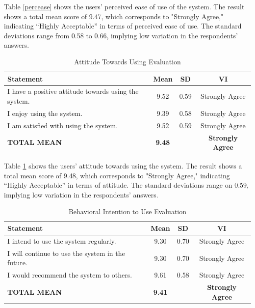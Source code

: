 	Table \ref{percease} shows the users’ perceived ease of use of the system. The result shows a total mean score of 9.47, which corresponds to "Strongly Agree," indicating “Highly Acceptable” in terms of perceived ease of use. The standard deviations range from 0.58 to 0.66, implying low variation in the respondents’ answers.
	
	\begin{table}[h!]
		\centering
		\caption{Attitude Towards Using Evaluation}
		\label{attuse}
		\renewcommand{\arraystretch}{1.2}
		\begin{tabularx}{\linewidth}{|X|c|c|c|}
			\hline
			\textbf{Statement} & \textbf{Mean} & \textbf{SD} & \textbf{VI} \\ \hline
			I have a positive attitude towards using the system.
			& 9.52 & 0.59 & Strongly Agree \\ \hline
			I enjoy using the system.
			& 9.39 & 0.58 & Strongly Agree \\ \hline
			I am satisfied with using the system.
			& 9.52 & 0.59 & Strongly Agree \\ \hline
			\textbf{TOTAL MEAN} & \textbf{9.48} & & \textbf{Strongly Agree} \\ \hline
		\end{tabularx}
	\end{table}
	
	Table \ref{attuse} shows the users’ attitude towards using the system. The result shows a total mean score of 9.48, which corresponds to "Strongly Agree," indicating “Highly Acceptable” in terms of attitude. The standard deviations range on 0.59, implying low variation in the respondents’ answers.
	
	
	\begin{table}[h!]
		\centering
		\caption{Behavioral Intention to Use Evaluation}
		\label{behint}
		\renewcommand{\arraystretch}{1.2}
		\begin{tabularx}{\linewidth}{|X|c|c|c|}
			\hline
			\textbf{Statement} & \textbf{Mean} & \textbf{SD} & \textbf{VI} \\ \hline
			I intend to use the system regularly.
			& 9.30 & 0.70 & Strongly Agree \\ \hline
			I will continue to use the system in the future.
			& 9.30 & 0.70 & Strongly Agree \\ \hline
			I would recommend the system to others.
			& 9.61 & 0.58 & Strongly Agree \\ \hline
			\textbf{TOTAL MEAN} & \textbf{9.41} & & \textbf{Strongly Agree} \\ \hline
		\end{tabularx}
	\end{table}
	
